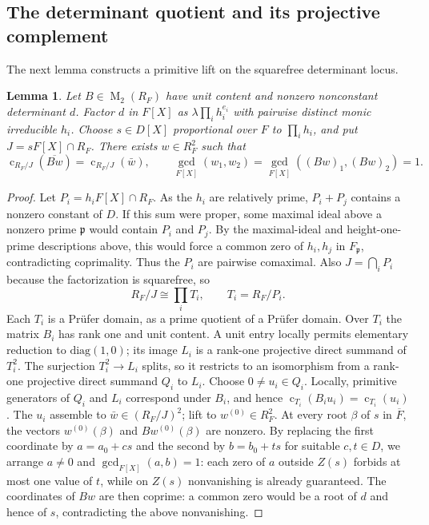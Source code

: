 \documentclass[11pt]{amsart}
\newtheorem{lemma}[theorem]{Lemma}
\theoremstyle{definition}
\theoremstyle{remark}
\newcommand{\cont}{\operatorname{c}}
\newcommand{\Mat}{\operatorname{M}}
\begin{document}
\subsection{The determinant quotient and its projective complement}

The next lemma constructs a primitive lift on the squarefree determinant locus.
\begin{lemma}
\label{lem:nfquot}
Let $B\in\Mat_2(R_F)$ have unit content and nonzero nonconstant
determinant $d$.  Factor $d$ in $F[X]$ as
$\lambda\prod_i h_i^{e_i}$ with pairwise distinct monic irreducible
$h_i$. Choose $s\in D[X]$ proportional over $F$ to
$\prod_i h_i$, and put $J=sF[X]\cap R_F$.
There exists $w\in R_F^2$ such that
\[
\cont_{R_F/J}(\overline{Bw})=\cont_{R_F/J}(\bar w),\qquad
\gcd_{F[X]}(w_1,w_2)=\gcd_{F[X]}((Bw)_1,(Bw)_2)=1.
\]
\end{lemma}
\begin{proof}
Let $P_i=h_iF[X]\cap R_F$. As the $h_i$ are relatively prime,
$P_i+P_j$ contains a nonzero constant of $D$.  If this sum were
proper, some maximal ideal above a nonzero prime $\mathfrak p$ would
contain $P_i$ and $P_j$.  By the maximal-ideal and height-one-prime descriptions above, this would force a common
zero of $h_i,h_j$ in $F_{\mathfrak p}$, contradicting coprimality.
Thus the $P_i$ are pairwise comaximal. Also
$J=\bigcap_iP_i$ because the factorization is squarefree, so
\[
R_F/J\cong\prod_i T_i,\qquad T_i=R_F/P_i.
\]
Each $T_i$ is a Pr\"ufer domain, as a prime quotient of a Pr\"ufer
domain. Over $T_i$ the matrix $B_i$ has rank one and unit content.
A unit entry locally permits elementary reduction to
$\mathrm{diag}(1,0)$; its image $L_i$ is a rank-one projective
direct summand of $T_i^2$. The surjection $T_i^2\to L_i$
splits, so it restricts to an isomorphism from a rank-one projective
direct summand $Q_i$ to $L_i$.
Choose $0\ne u_i\in Q_i$.  Locally, primitive generators of
$Q_i$ and $L_i$ correspond under $B_i$, and hence
$\cont_{T_i}(B_iu_i)=\cont_{T_i}(u_i)$.
The $u_i$ assemble to $\bar w\in(R_F/J)^2$; lift to
$w^{(0)}\in R_F^2$. At every root $\beta$ of $s$ in
$\overline F$, the vectors $w^{(0)}(\beta)$ and
$Bw^{(0)}(\beta)$ are nonzero.  By replacing the first
coordinate by $a=a_0+cs$ and the second by $b=b_0+ts$ for
suitable $c,t\in D$, we arrange $a\ne0$ and
$\gcd_{F[X]}(a,b)=1$: each zero of $a$ outside $Z(s)$
forbids at most one value of $t$, while on $Z(s)$ nonvanishing
is already guaranteed. The coordinates of $Bw$ are then
coprime: a common zero would be a root of $d$ and hence of
$s$, contradicting the above nonvanishing.
\end{proof}
\end{document}
